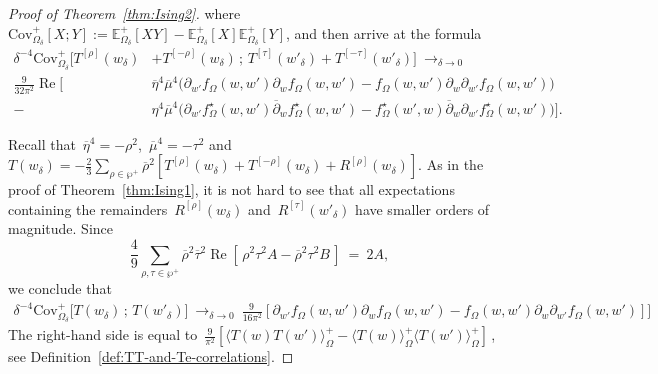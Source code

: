 \documentclass[reqno,11pt,a4paper]{amsart}
\theoremstyle{remark}
\newcommand{\Trho}{T^{[\rho]}}
\newcommand{\Rrho}{R^{[\rho]}}
\newcommand{\Tmrho}{T^{\left[-\rho \right]}}
\newcommand{\Ttau}{T^{[\tau]}}
\newcommand{\Tmtau}{T^{[-\tau]}}
\newcommand{\Rtau}{R^{[\tau]}}  %
\newcommand{\Edelta}{\mathbb{E}_{\Omega_\delta}}
\newcommand{\f}{f_{\Omega}}
\newcommand{\fstar}{f_{\Omega}^\star}
\renewcommand\Re{\operatorname{Re}}
\newcommand\Corr[1]{\langle #1 \rangle}
\newcommand\CorrO[2][+]{\Corr{#2}_\Omega^{#1}}
\begin{document}
\begin{proof}[Proof of Theorem~\ref{thm:Ising2}]
where~$\mathrm{Cov}_{\Omega_\delta}^+[X;Y]:=\Edelta^+[XY]-\Edelta^+[X]\Edelta^+[Y]$, and then %
arrive at the formula
\begin{align*}
\delta^{-4}\mathrm{Cov}_{\Omega_\delta}^+\big[\Trho(w_\delta)&+\Tmrho(w_\delta)\,;\,\Ttau(w'_\delta)+\Tmtau(w'_\delta)\big]\ \mathop{\to}_{\delta\to 0} \\
 \tfrac{9}{32\pi^2}\Re\big[\,&\overline{\eta}^4\overline{\mu}^4\big(\partial_{w'}\f(w,w')\partial_{w}\f(w,w') - \f(w,w')\partial_w\partial_{w'}\f(w,w')\big)\\
  - & \eta^4\overline{\mu}^4\big(\partial_{w'}\fstar(w,w')\overline{\partial}_{w}\fstar(w,w')- \fstar(w',w)\overline{\partial}_{w}\partial_{w'}\fstar(w,w')\big)\big].
\end{align*}

Recall that~$\overline{\eta}^4=-\rho^2$,~$\overline{\mu}^4=-\tau^2$ and ~$T(w_\delta)=-\frac{2}{3}\sum_{\rho\in\wp^+}\overline{\rho}^2[\Trho(w_\delta)+\Tmrho(w_\delta)+\Rrho(w_\delta)]$. As in the proof of Theorem~\ref{thm:Ising1}, it is not hard to see that all expectations containing the remainders~$\Rrho(w_\delta)$ and~$\Rtau(w'_\delta)$ have smaller orders of magnitude. Since
\[
\textstyle\frac{4}{9}\sum_{\rho,\tau\in\wp^+}\overline{\rho}^2\overline{\tau}^2\Re[\,\rho^2\tau^2A-\overline{\rho}^2\tau^2 B\,]~=~2A,
\]
we conclude that
\begin{align*}
\delta^{-4}\mathrm{Cov}_{\Omega_\delta}^+\big[T(w_\delta)\,;\,T(w'_\delta)\big]\ \mathop{\to}_{\delta\to 0}\ \tfrac{9\,}{16\pi^2}[\partial_{w'}\f(w,w')\partial_{w}\f(w,w')-\f(w,w')\partial_{w}\partial_{w'}\f(w,w')]\big]
\end{align*}
The right-hand side is equal to~$\tfrac{9}{\pi^2}[\CorrO{T(w)T(w')}-\CorrO{T(w)}\CorrO{T(w')}]$\,, see Definition~\ref{def:TT-and-Te-correlations}.
\end{proof}
\end{document}

